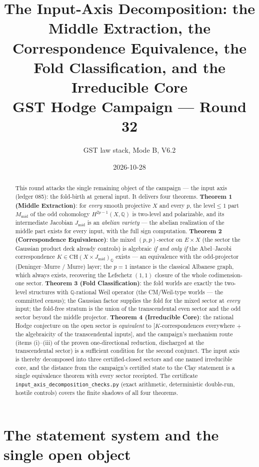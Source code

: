 \documentclass[11pt]{article}
\title{The Input-Axis Decomposition: the Middle Extraction, the Correspondence Equivalence, the Fold Classification, and the Irreducible Core\\[6pt]
\large GST Hodge Campaign --- Round 32}
\author{GST law stack, Mode B, V6.2}
\date{2026-10-28}
\newcommand{\Q}{\mathbb{Q}}
\newcommand{\CH}{\mathrm{CH}}
\begin{document}
\maketitle

\begin{abstract}
This round attacks the single remaining object of the campaign --- the input axis
(ledger 085): the fold-birth at general input. It delivers four theorems.
\textbf{Theorem 1 (Middle Extraction)}: for \emph{every} smooth projective $X$
and every $p$, the level${}\le{}1$ part $M_{\mathrm{mid}}$ of the odd cohomology
$H^{2p-1}(X,\Q)$ is two-level and polarizable, and its intermediate Jacobian
$J_{\mathrm{mid}}$ is an \emph{abelian variety} --- the abelian realization of the
middle part exists for every input, with the full sign computation.
\textbf{Theorem 2 (Correspondence Equivalence)}: the mixed $(p,p)$-sector on
$E\times X$ (the sector the Gaussian product deck already controls) is algebraic
\emph{if and only if} the Abel--Jacobi correspondence
$K\in \CH(X\times J_{\mathrm{mid}})_\Q$ exists --- an equivalence with the
odd-projector (Deninger--Murre / Murre) layer; the $p=1$ instance is the
classical Albanese graph, which always exists, recovering the Lefschetz $(1,1)$
closure of the whole codimension-one sector. \textbf{Theorem 3 (Fold
Classification)}: the fold worlds are exactly the two-level structures with
$\Q$-rational Weil operator (the CM/Weil-type worlds --- the committed census);
the Gaussian factor supplies the fold for the mixed sector at \emph{every} input;
the fold-free stratum is the union of the transcendental even sector and the
odd sector beyond the middle projector. \textbf{Theorem 4 (Irreducible Core)}:
the rational Hodge conjecture on the open sector is \emph{equivalent} to
$[$$K$-correspondences everywhere $+$ the algebraicity of the transcendental
inputs$]$, and the campaign's mechanism route (items (i)--(iii) of the proven
one-directional reduction, discharged at the transcendental sector) is a
sufficient condition for the second conjunct. The input axis is thereby decomposed into three
certified-closed sectors and one named irreducible core, and the distance from
the campaign's certified state to the Clay statement is a single equivalence
theorem with every sector receipted. The certificate
\texttt{input\_axis\_decomposition\_checks.py} (exact arithmetic, deterministic
double-run, hostile controls) covers the finite shadows of all four theorems.
\end{abstract}

\section{The statement system and the single open object}
\end{document}
